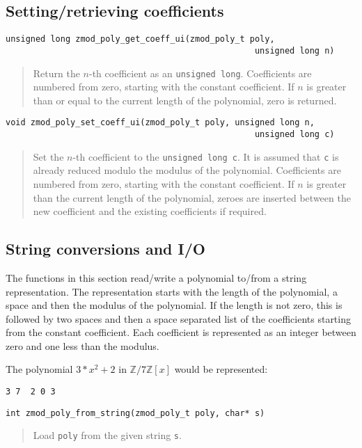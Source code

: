 \documentclass[a4paper,10pt]{article}
\newcommand{\Z}{\mathbb{Z}}
\newcommand{\code}{\lstinline}
\begin{document}
\subsection{Setting/retrieving coefficients}

\begin{lstlisting}
unsigned long zmod_poly_get_coeff_ui(zmod_poly_t poly, 
                                                  unsigned long n)
\end{lstlisting}
\begin{quote}
Return the $n$-th coefficient as an \code{unsigned long}. Coefficients are numbered from zero, starting with the constant coefficient. If $n$ is greater than or equal to the current length of the polynomial, zero is returned.
\end{quote}

\begin{lstlisting}
void zmod_poly_set_coeff_ui(zmod_poly_t poly, unsigned long n, 
                                                  unsigned long c)
\end{lstlisting}
\begin{quote}
Set the $n$-th coefficient to the \code{unsigned long c}. It is assumed that \code{c} is already reduced modulo the modulus of the polynomial. Coefficients are numbered from zero, starting with the constant coefficient. If $n$ is greater than the current length of the polynomial, zeroes are inserted between the new coefficient and the existing coefficients if required.
\end{quote}

\subsection{String conversions and I/O}
The functions in this section read/write a polynomial to/from a string representation. The representation starts with the length of the polynomial, a space and then the modulus of the polynomial. If the length is not zero, this is followed by two spaces and then a space separated list of the coefficients starting from the constant coefficient. Each coefficient is represented as an integer between zero and one less than the modulus.

The polynomial $3*x^2+2$ in $\Z/7\Z[x]$ would be represented:

\begin{lstlisting}
3 7  2 0 3
\end{lstlisting}

\begin{lstlisting}
int zmod_poly_from_string(zmod_poly_t poly, char* s)
\end{lstlisting}
\begin{quote}
Load \code{poly} from the given string \code{s}.
\end{quote}
\end{document}
